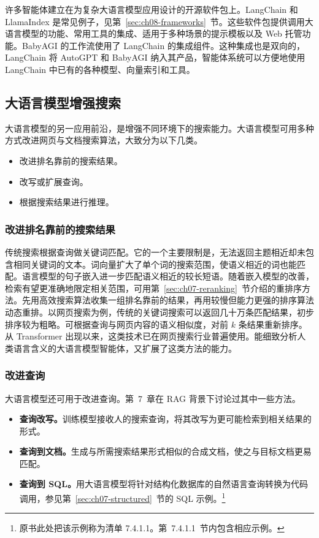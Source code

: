 \begin{practicaltip}
许多智能体建立在为复杂大语言模型应用设计的开源软件包上。LangChain 和 LlamaIndex 是常见例子，见第~\ref{sec:ch08-frameworks}~节。这些软件包提供调用大语言模型的功能、常用工具的集成、适用于多种场景的提示模板以及 Web 托管功能。BabyAGI 的工作流使用了 LangChain 的集成组件。这种集成也是双向的，LangChain 将 AutoGPT 和 BabyAGI 纳入其产品，智能体系统可以方便地使用 LangChain 中已有的各种模型、向量索引和工具。
\end{practicaltip}

\subsection{大语言模型增强搜索}
\label{sec:ch10-search}
大语言模型的另一应用前沿，是增强不同环境下的搜索能力。大语言模型可用多种方式改进网页与文档搜索算法，大致分为以下几类。
\begin{itemize}
\item 改进排名靠前的搜索结果。
\item 改写或扩展查询。
\item 根据搜索结果进行推理。
\end{itemize}

\subsubsection*{改进排名靠前的搜索结果}
传统搜索根据查询做关键词匹配。它的一个主要限制是，无法返回主题相近却未包含相同关键词的文本。词向量扩大了单个词的搜索范围，使语义相近的词也能匹配。语言模型的句子嵌入进一步匹配语义相近的较长短语。随着嵌入模型的改善，检索有望更准确地限定相关范围，可用第~\ref{sec:ch07-reranking}~节介绍的重排序方法。先用高效搜索算法收集一组排名靠前的结果，再用较慢但能力更强的排序算法动态重排。以网页搜索为例，传统的关键词搜索可以返回几十万条匹配结果，初步排序较为粗略。可根据查询与网页内容的语义相似度，对前 $k$ 条结果重新排序。从 Transformer 出现以来，这类技术已在网页搜索行业普遍使用。能细致分析人类语言含义的大语言模型智能体，又扩展了这类方法的能力。

\subsubsection*{改进查询}
大语言模型还可用于改进查询。第~7~章在 RAG 背景下讨论过其中一些方法。
\begin{itemize}
\item \textbf{查询改写。}训练模型接收人的搜索查询，将其改写为更可能检索到相关结果的形式。
\item \textbf{查询到文档。}生成与所需搜索结果形式相似的合成文档，使之与目标文档更易匹配。
\item \textbf{查询到 SQL。}用大语言模型将针对结构化数据库的自然语言查询转换为代码调用，参见第~\ref{sec:ch07-structured}~节的 SQL 示例。\footnote{原书此处把该示例称为清单 7.4.1.1。第~7.4.1.1~节内包含相应示例。}
\end{itemize}

